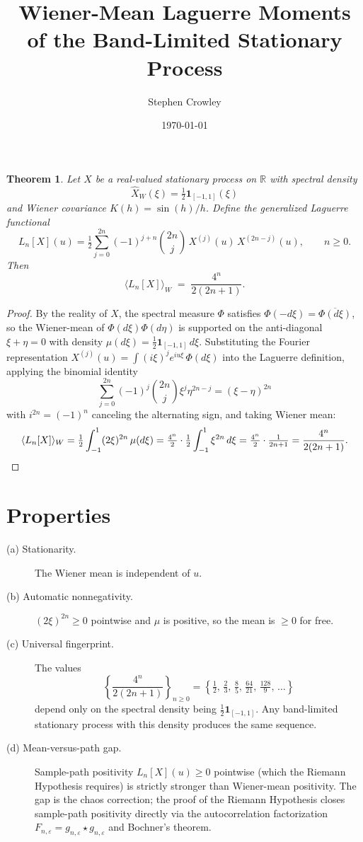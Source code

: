 \documentclass[11pt]{amsart}
\title{Wiener-Mean Laguerre Moments\\
of the Band-Limited Stationary Process}
\author{Stephen Crowley}
\date{\today}
\theoremstyle{plain}
\newtheorem{theorem}{Theorem}
\newcommand{\R}{\mathbb{R}}
\begin{document}
\maketitle

\begin{theorem}
Let $X$ be a real-valued stationary process on $\R$ with spectral density
\[
\widehat{X}_W(\xi) = \tfrac{1}{2}\mathbf{1}_{[-1,1]}(\xi)
\]
and Wiener covariance $K(h) = \sin(h)/h$. Define the generalized Laguerre functional
\[
L_n[X](u) = \tfrac{1}{2}\sum_{j=0}^{2n}(-1)^{j+n}\binom{2n}{j}\,X^{(j)}(u)\,X^{(2n-j)}(u),\qquad n \geq 0.
\]
Then
\[
\langle L_n[X]\rangle_W \;=\; \frac{4^n}{2(2n+1)}.
\]
\end{theorem}

\begin{proof}
By the reality of $X$, the spectral measure $\Phi$ satisfies $\Phi(-d\xi) = \overline{\Phi(d\xi)}$, so the Wiener-mean of $\Phi(d\xi)\Phi(d\eta)$ is supported on the anti-diagonal $\xi + \eta = 0$ with density $\mu(d\xi) = \tfrac{1}{2}\mathbf{1}_{[-1,1]}\,d\xi$. Substituting the Fourier representation $X^{(j)}(u) = \int(i\xi)^j e^{iu\xi}\,\Phi(d\xi)$ into the Laguerre definition, applying the binomial identity
\[
\sum_{j=0}^{2n}(-1)^j\binom{2n}{j}\xi^j\eta^{2n-j} = (\xi-\eta)^{2n}
\]
with $i^{2n} = (-1)^n$ canceling the alternating sign, and taking Wiener mean:
\[
\langle L_n[X]\rangle_W
= \tfrac{1}{2}\int_{-1}^{1}(2\xi)^{2n}\,\mu(d\xi)
= \tfrac{4^n}{2}\cdot\tfrac{1}{2}\int_{-1}^{1}\xi^{2n}\,d\xi
= \tfrac{4^n}{2}\cdot\tfrac{1}{2n+1}
= \frac{4^n}{2(2n+1)}.
\qedhere
\]
\end{proof}

\section*{Properties}

\begin{description}
  \item[(a) Stationarity.] The Wiener mean is independent of $u$.
  \item[(b) Automatic nonnegativity.] $(2\xi)^{2n} \geq 0$ pointwise and $\mu$ is positive, so the mean is $\geq 0$ for free.
  \item[(c) Universal fingerprint.] The values
  \[
  \left\{\frac{4^n}{2(2n+1)}\right\}_{n \geq 0} = \left\{\tfrac{1}{2},\,\tfrac{2}{3},\,\tfrac{8}{5},\,\tfrac{64}{21},\,\tfrac{128}{9},\,\ldots\right\}
  \]
  depend only on the spectral density being $\tfrac{1}{2}\mathbf{1}_{[-1,1]}$. Any band-limited stationary process with this density produces the same sequence.
  \item[(d) Mean-versus-path gap.] Sample-path positivity $L_n[X](u) \geq 0$ pointwise (which the Riemann Hypothesis requires) is strictly stronger than Wiener-mean positivity. The gap is the chaos correction; the proof of the Riemann Hypothesis closes sample-path positivity directly via the autocorrelation factorization $F_{n,\varepsilon} = g_{n,\varepsilon} \star g_{n,\varepsilon}$ and Bochner's theorem.
\end{description}
\end{document}
